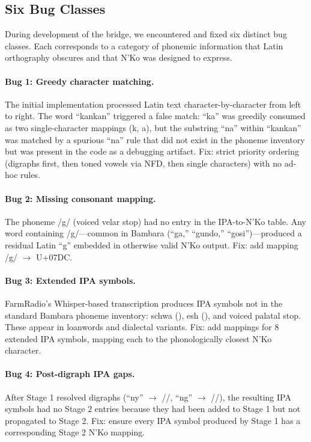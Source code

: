 \documentclass[11pt]{article}
\begin{document}
\subsection{Six Bug Classes}

During development of the bridge, we encountered and fixed six distinct bug classes.
Each corresponds to a category of phonemic information that Latin orthography obscures and that N'Ko was designed to express.

\paragraph{Bug 1: Greedy character matching.}
The initial implementation processed Latin text character-by-character from left to right.
The word ``kankan'' triggered a false match: ``ka'' was greedily consumed as two single-character mappings (k, a), but the substring ``na'' within ``kankan'' was matched by a spurious ``na'' rule that did not exist in the phoneme inventory but was present in the code as a debugging artifact.
Fix: strict priority ordering (digraphs first, then toned vowels via NFD, then single characters) with no ad-hoc rules.

\paragraph{Bug 2: Missing consonant mapping.}
The phoneme /g/ (voiced velar stop) had no entry in the IPA-to-N'Ko table.
Any word containing /g/---common in Bambara (``ga,'' ``gundo,'' ``gosi'')---produced a residual Latin ``g'' embedded in otherwise valid N'Ko output.
Fix: add mapping /g/ $\to$ U+07DC.

\paragraph{Bug 3: Extended IPA symbols.}
FarmRadio's Whisper-based transcription produces IPA symbols not in the standard Bambara phoneme inventory: schwa (), esh (), and voiced palatal stop.
These appear in loanwords and dialectal variants.
Fix: add mappings for 8 extended IPA symbols, mapping each to the phonologically closest N'Ko character.

\paragraph{Bug 4: Post-digraph IPA gaps.}
After Stage 1 resolved digraphs (``ny'' $\to$ //, ``ng'' $\to$ //), the resulting IPA symbols had no Stage 2 entries because they had been added to Stage 1 but not propagated to Stage 2.
Fix: ensure every IPA symbol produced by Stage 1 has a corresponding Stage 2 N'Ko mapping.
\end{document}
